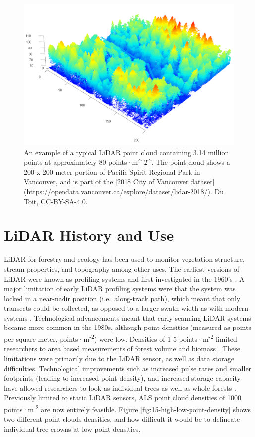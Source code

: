 \documentclass[
]{book}
\begin{document}
\begin{figure}
\includegraphics[width=0.8\linewidth]{images/15-las-denoise} \caption{An example of a typical LiDAR point cloud containing 3.14 million points at approximately 80 points·m^-2^. The point cloud shows a 200 x 200 meter portion of Pacific Spirit Regional Park in Vancouver, and is part of the [2018 City of Vancouver dataset] (https://opendata.vancouver.ca/explore/dataset/lidar-2018/). Du Toit, CC-BY-SA-4.0.}\label{fig:15-las-denoise}
\end{figure}

\section{LiDAR History and Use}\label{lidar-history-and-use}

LiDAR for forestry and ecology has been used to monitor vegetation structure, stream properties, and topography among other uses. The earliest versions of LiDAR were known as profiling systems and first investigated in the 1960's \citep{nelson_how_2013}. A major limitation of early LiDAR profiling systems were that the system was locked in a near-nadir position (i.e.~along-track path), which meant that only transects could be collected, as opposed to a larger swath width as with modern systems \citep{nelson_how_2013, lim_lidar_2003}. Technological advancements meant that early scanning LiDAR systems became more common in the 1980s, although point densities (measured as points per square meter, points·m\textsuperscript{-2}) were low. Densities of 1-5 points·m\textsuperscript{-2} limited researchers to area based measurements of forest volume and biomass \citep{nelson_how_2013}. These limitations were primarily due to the LiDAR sensor, as well as data storage difficulties. Technological improvements such as increased pulse rates and smaller footprints (leading to increased point density), and increased storage capacity have allowed researchers to look as individual trees as well as whole forests \citep{jakubowski_delineating_2013}. Previously limited to static LiDAR sensors, ALS point cloud densities of 1000 points·m\textsuperscript{-2} are now entirely feasible. Figure \ref{fig:15-high-low-point-density} shows two different point clouds densities, and how difficult it would be to delineate individual tree crowns at low point densities.
\end{document}
